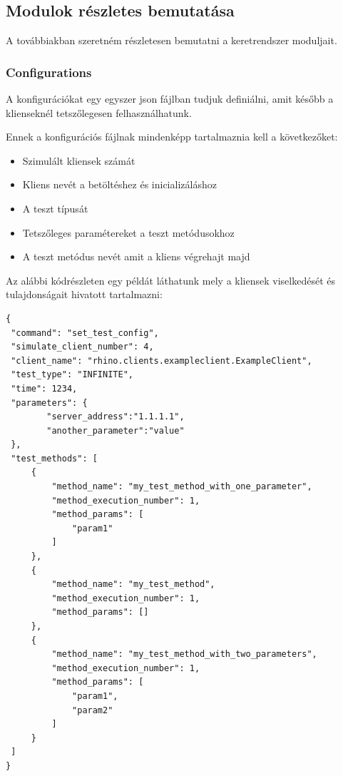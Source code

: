 \documentclass[a4paper,12pt,oneside]{report}
\begin{document}
\subsection{Modulok részletes bemutatása}

A továbbiakban szeretném részletesen bemutatni a keretrendszer moduljait.

\subsubsection{Configurations} \label{sssec:configurations}

A konfigurációkat egy egyszer json fájlban tudjuk definiálni, amit később a klienseknél tetszőlegesen felhasználhatunk.

Ennek a konfigurációs fájlnak mindenképp tartalmaznia kell a következőket:
\begin{itemize}
	\itemsep0em
		\item Szimulált kliensek számát
		\item Kliens nevét a betöltéshez és inicializáláshoz
		\item A teszt típusát
		\item Tetszőleges paramétereket a teszt metódusokhoz
		\item A teszt metódus nevét amit a kliens végrehajt majd
\end{itemize}
\newpage

Az alábbi kódrészleten egy példát láthatunk mely a kliensek viselkedését és tulajdonságait hivatott tartalmazni:

\begin{lstlisting}
{
 "command": "set_test_config",
 "simulate_client_number": 4,
 "client_name": "rhino.clients.exampleclient.ExampleClient",
 "test_type": "INFINITE",
 "time": 1234,
 "parameters": {
        "server_address":"1.1.1.1",
        "another_parameter":"value"
 },
 "test_methods": [
     {
         "method_name": "my_test_method_with_one_parameter",
         "method_execution_number": 1,
         "method_params": [
             "param1"
         ]
     },
     {
         "method_name": "my_test_method",
         "method_execution_number": 1,
         "method_params": []
     },
     {
         "method_name": "my_test_method_with_two_parameters",
         "method_execution_number": 1,
         "method_params": [
             "param1",
             "param2"
         ]
     }
 ]
}
\end{lstlisting}
\end{document}
